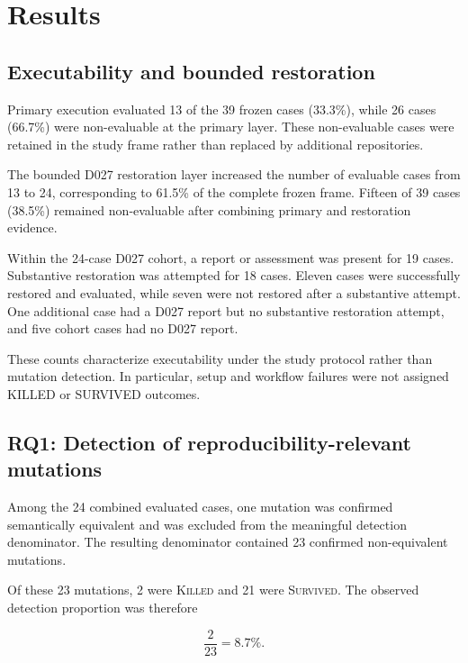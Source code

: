 \section{Results}
\label{sec:results}

\subsection{Executability and bounded restoration}
\label{sec:results-executability}

Primary execution evaluated 13 of the 39 frozen cases (33.3\%), while 26
cases (66.7\%) were non-evaluable at the primary layer. These non-evaluable
cases were retained in the study frame rather than replaced by additional
repositories.



The bounded D027 restoration layer increased the number of evaluable cases
from 13 to 24, corresponding to 61.5\% of the complete frozen frame. Fifteen
of 39 cases (38.5\%) remained non-evaluable after combining primary and
restoration evidence.

Within the 24-case D027 cohort, a report or assessment was present for 19
cases. Substantive restoration was attempted for 18 cases. Eleven cases were
successfully restored and evaluated, while seven were not restored after a
substantive attempt. One additional case had a D027 report but no substantive
restoration attempt, and five cohort cases had no D027 report.

These counts characterize executability under the study protocol rather than
mutation detection. In particular, setup and workflow failures were not
assigned KILLED or SURVIVED outcomes.


\FloatBarrier

\subsection{RQ1: Detection of reproducibility-relevant mutations}
\label{sec:results-rq1}

Among the 24 combined evaluated cases, one mutation was confirmed
semantically equivalent and was excluded from the meaningful detection
denominator. The resulting denominator contained 23 confirmed
non-equivalent mutations.

Of these 23 mutations, 2 were \textsc{Killed} and 21 were
\textsc{Survived}. The observed detection proportion was therefore

\[
\frac{2}{23} = 8.7\%.
\]

